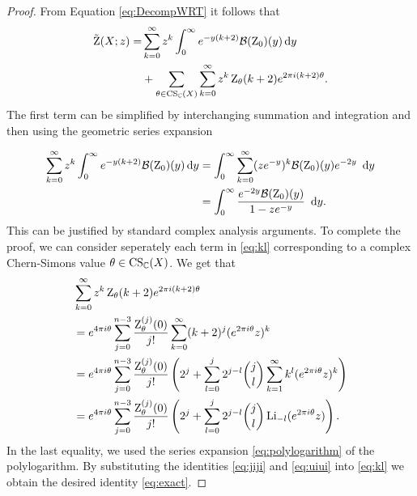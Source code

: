 \begin{proof}
	From Equation \eqref{eq:DecompWRT} it follows that \begin{align}  \label{eq:kl} \begin{split} 
	\tilde{\operatorname{Z}}(X;z)=& \sum_{k=0}^{\infty} z^k \int_0^{\infty} e^{-y(k+2)} \mathcal{B}(\operatorname{Z}_0)(y) \operatorname{{d}\hskip-.6mm} y 
	\\ & + \sum_{ \theta \in \operatorname{CS}_{\mathbb{C}}(X)}  \sum_{k=0}^{\infty}  z^k \operatorname{Z}_{\theta}(k+2) e^{2\pi i (k+2) \theta} . \end{split}
	\end{align}
	The first term can be simplified by interchanging summation and integration and then using the geometric series expansion
	
	\begin{align} \label{eq:jiji}  \begin{split} 
	\sum_{k=0}^{\infty} z^k \int_0^{\infty} e^{-y(k+2)} \mathcal{B}(\operatorname{Z}_0)(y) \operatorname{{d}\hskip-.6mm} y &= \int_0^{\infty} \sum_{k=0}^{\infty}  (ze^{-y})^k \mathcal{B}(\operatorname{Z}_0)(y) e^{-2y} \ \operatorname{{d}\hskip-.6mm} y
	\\ &= \int_0^{\infty} \frac{e^{-2y}\mathcal{B}(\operatorname{Z}_0)(y) }{1-ze^{-y}} \ \operatorname{{d}\hskip-.6mm} y.   \end{split} 
	\end{align}
	This can be justified by standard complex analysis arguments. To complete the proof, we can consider seperately each term in \eqref{eq:kl} corresponding to a complex Chern-Simons value $\theta \in \operatorname{CS}_{\mathbb{C}}(X)$. We get that
	\begin{align} \label{eq:uiui} \begin{split} 
	&	\sum_{k=0}^{\infty} z^k \operatorname{Z}_{\theta}(k+2) e^{2\pi i (k+2)\theta}
	\\ &=e^{4\pi i \theta} \sum_{j=0}^{n-3} \frac{\operatorname{Z}_{\theta}^{(j)}(0)}{j!}\sum_{k=0}^{\infty} (k+2)^j (e^{2\pi i \theta }z)^k 
	\\ &= e^{4\pi i \theta} \sum_{j=0}^{n-3} \frac{\operatorname{Z}_{\theta}^{(j)}(0)}{j!}\left(2^j +\sum_{l=0}^{j} 2^{j-l}\binom{j}{l} \sum_{k=1}^{\infty} k^l (e^{2\pi i\theta } z)^k \right)
	\\ &=e^{4\pi i \theta} \sum_{j=0}^{n-3} \frac{\operatorname{Z}_{\theta}^{(j)}(0)}{j!} \left(2^j +\sum_{l=0}^{j} 2^{j-l}\binom{j}{l} \operatorname{Li}_{-l}(e^{2\pi i\theta}z) \right). \end{split}
	\end{align}
	In the last equality, we used the series expansion \eqref{eq:polylogarithm} of the polylogarithm. By substituting the identities \eqref{eq:jiji} and \eqref{eq:uiui} into \eqref{eq:kl} we obtain the desired identity \eqref{eq:exact}.
\end{proof}
